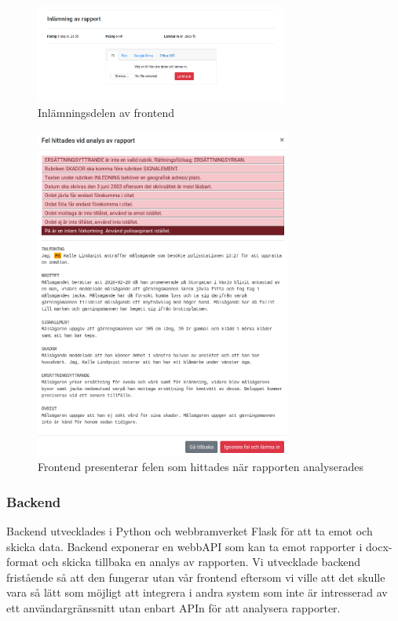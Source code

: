 \documentclass[swedish]{maucsthesis}
\begin{document}
\begin{figure}[H]
    \centering
    \includegraphics[width=0.74\textwidth]{frontendstart.png}
    \caption{Inlämningsdelen av frontend}
    \label{fig:frontendstart}
\end{figure}

\begin{figure}[H]
    \centering
    \includegraphics[width=0.75\textwidth]{frontenderrors.png}
    \caption{Frontend presenterar felen som hittades när rapporten analyserades}
    \label{fig:frontenderrors}
\end{figure}

\subsubsection{Backend}

Backend utvecklades i Python och webbramverket Flask för att ta emot och skicka
data. Backend exponerar en webbAPI som kan ta emot rapporter i docx-format
och skicka tillbaka en analys av rapporten. Vi utvecklade backend
fristående så att den fungerar utan vår frontend eftersom vi ville att det
skulle vara så lätt som möjligt att integrera i andra system som inte är
intresserad av ett användargränssnitt utan enbart APIn för att analysera
rapporter.
\end{document}

